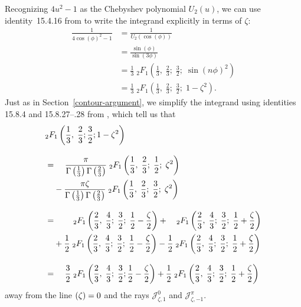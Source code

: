 \documentclass{article}
\let\Re\relax
\DeclareMathOperator{\Re}{Re}
\theoremstyle{definition}
\theoremstyle{plain}
\newenvironment{revised}{\color{DarkBlue}}{\color{black}}
\begin{document}
\begin{revised}
Recognizing $4u^2 - 1$ as the Chebyshev polynomial $U_2(u)$, we can use identity~15.4.16 from \cite{dlmf} to write the integrand explicitly in terms of $\zeta$:
\begin{align*}
\frac{1}{4 \cos(\phi)^2 - 1} & = \frac{1}{U_2(\cos(\phi))} \\
& = \frac{\sin(\phi)}{\sin(3\phi)} \\
& = \frac{1}{3}\;{}_2F_1\left(\frac{1}{3},\;\frac{2}{3};\;\frac{3}{2};\;\sin(n \phi)^2\right) \\
& = \frac{1}{3}\;{}_2F_1\left(\frac{1}{3},\;\frac{2}{3};\;\frac{3}{2};\;1 - \zeta^2\right).
\end{align*}
Just as in Section~\ref{contour-argument}, we simplify the integrand using identities 15.8.4 and 15.8.27\;--.28 from \cite{dlmf}, which tell us that\begin{align*}
&{}_2F_1\left(\frac{1}{3},\;\frac{2}{3}; \frac{3}{2}; 1 - \zeta^2\right) \\[3mm]
& =\; \hphantom{+} \frac{\pi}{\Gamma\left(\frac{1}{3}\right) \Gamma\left(\frac{2}{3}\right)}\;{}_2F_1\left(\frac{1}{3},\;\frac{2}{3};\;\frac{1}{2};\;\zeta^2\right) \\
& \hphantom{=}\; - \frac{\pi \zeta}{\Gamma\left(\frac{1}{3}\right) \Gamma\left(\frac{2}{3}\right)}\;{}_2F_1\left(\frac{1}{3},\;\frac{2}{3};\;\frac{3}{2};\;\zeta^2\right) \\[3mm]
& =\; \hphantom{+ \frac{0}{0}}\;{}_2F_1\left(\frac{2}{3},\;\frac{4}{3};\;\frac{3}{2};\;\frac{1}{2} - \frac{\zeta}{2}\right) + \hphantom{\frac{0}{0}}\;{}_2F_1\left(\frac{2}{3},\;\frac{4}{3};\;\frac{3}{2};\;\frac{1}{2} + \frac{\zeta}{2}\right) \\
& \hphantom{=}\; + \frac{1}{2}\;{}_2F_1\left(\frac{2}{3},\;\frac{4}{3};\;\frac{3}{2};\;\frac{1}{2} - \frac{\zeta}{2}\right) - \frac{1}{2}\;{}_2F_1\left(\frac{2}{3},\;\frac{4}{3};\;\frac{3}{2};\;\frac{1}{2} + \frac{\zeta}{2}\right) \\[3mm]
& =\; \hphantom{+} \frac{3}{2}\;{}_2F_1\left(\frac{2}{3},\;\frac{4}{3};\;\frac{3}{2};\frac{1}{2} - \frac{\zeta}{2}\right) + \frac{1}{2}\;{}_2F_1\left(\frac{2}{3},\;\frac{4}{3};\;\frac{3}{2};\;\frac{1}{2} + \frac{\zeta}{2}\right)
\end{align*}
away from the line $\Re(\zeta) = 0$ and the rays $\mathcal{J}^0_{\zeta,1}$ and $\mathcal{J}^\pi_{\zeta,-1}$.


\end{revised}
\end{document}
